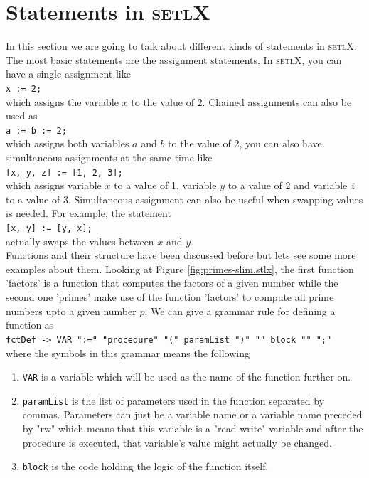 \documentclass[11pt]{report}
\begin{document}
\section{Statements in \textsc{setlX}}
In this section we are going to talk about different kinds of statements in \textsc{setlX}. The most basic statements are the assignment statements. In \textsc{setlX}, you can have a single assignment like
\\[0.2cm]
\hspace*{1.3cm}
\texttt{x := 2;}
\\[0.2cm]
which assigns the variable $x$ to the value of $2$. Chained assignments can also be used as
\\[0.2cm]
\hspace*{1.3cm}
\texttt{a := b := 2;}
\\[0.2cm]
which assigns both variables $a$ and $b$ to the value of 2, you can also have simultaneous assignments at the same time like
\\[0.2cm]
\hspace*{1.3cm}
\texttt{[x, y, z] := [1, 2, 3];}
\\[0.2cm]
which assigns variable $x$ to a value of 1, variable $y$ to a value of 2 and variable $z$ to a value of 3. Simultaneous assignment can also be useful when swapping values is needed. For example, the statement
\\[0.2cm]
\hspace*{1.3cm}
\texttt{[x, y] := [y, x];}
\\[0.2cm]
actually swaps the values between $x$ and $y$.
\\

Functions and their structure have been discussed before but lets see some more examples about them. Looking at Figure \ref{fig:primes-slim.stlx}, the first function 'factors' is a function that computes the factors of a given number while the second one 'primes' make use of the function 'factors' to compute all prime numbers upto a given number $p$. We can give a grammar rule for defining a function as
\\[0.2cm]
\hspace*{1.3cm}
\texttt{fctDef -> VAR ":=" "procedure" "(" paramList ")" "{" block "}" ";"}
\\[0.2cm]
where the symbols in this grammar means the following
\begin{enumerate}
\item \texttt{VAR} is a variable which will be used as the name of the function further on.
\item \texttt{paramList} is the list of parameters used in the function separated by commas. Parameters can just be a variable name or a variable name preceded by "rw" which means that this variable is a "read-write" variable and after the procedure is executed, that variable's value might actually be changed.
\item \texttt{block} is the code holding the logic of the function itself.
\end{enumerate}
\end{document}
